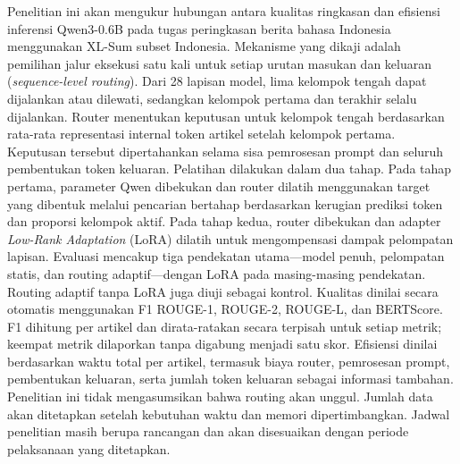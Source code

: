 \documentclass[proposal,indonesia]{ugmskripsi}
\begin{document}
\begingroup
{}
\cover
\clearpage
\titlepageind
\clearpage
\endgroup
\begingroup
\setlength{\tabcolsep}{0pt}
\approvalpage
\clearpage
\endgroup

\tableofcontents

\abstractind

Penelitian ini akan mengukur hubungan antara kualitas ringkasan dan efisiensi inferensi Qwen3-0.6B pada tugas peringkasan berita bahasa Indonesia menggunakan XL-Sum subset Indonesia. Mekanisme yang dikaji adalah pemilihan jalur eksekusi satu kali untuk setiap urutan masukan dan keluaran (\textit{sequence-level routing}). Dari 28 lapisan model, lima kelompok tengah dapat dijalankan atau dilewati, sedangkan kelompok pertama dan terakhir selalu dijalankan. Router menentukan keputusan untuk kelompok tengah berdasarkan rata-rata representasi internal token artikel setelah kelompok pertama. Keputusan tersebut dipertahankan selama sisa pemrosesan prompt dan seluruh pembentukan token keluaran. Pelatihan dilakukan dalam dua tahap. Pada tahap pertama, parameter Qwen dibekukan dan router dilatih menggunakan target yang dibentuk melalui pencarian bertahap berdasarkan kerugian prediksi token dan proporsi kelompok aktif. Pada tahap kedua, router dibekukan dan adapter \textit{Low-Rank Adaptation} (LoRA) dilatih untuk mengompensasi dampak pelompatan lapisan. Evaluasi mencakup tiga pendekatan utama—model penuh, pelompatan statis, dan routing adaptif—dengan LoRA pada masing-masing pendekatan. Routing adaptif tanpa LoRA juga diuji sebagai kontrol. Kualitas dinilai secara otomatis menggunakan F1 ROUGE-1, ROUGE-2, ROUGE-L, dan BERTScore. F1 dihitung per artikel dan dirata-ratakan secara terpisah untuk setiap metrik; keempat metrik dilaporkan tanpa digabung menjadi satu skor. Efisiensi dinilai berdasarkan waktu total per artikel, termasuk biaya router, pemrosesan prompt, pembentukan keluaran, serta jumlah token keluaran sebagai informasi tambahan. Penelitian ini tidak mengasumsikan bahwa routing akan unggul. Jumlah data akan ditetapkan setelah kebutuhan waktu dan memori dipertimbangkan. Jadwal penelitian masih berupa rancangan dan akan disesuaikan dengan periode pelaksanaan yang ditetapkan.
\endabstractind

\abstracteng
\end{document}
